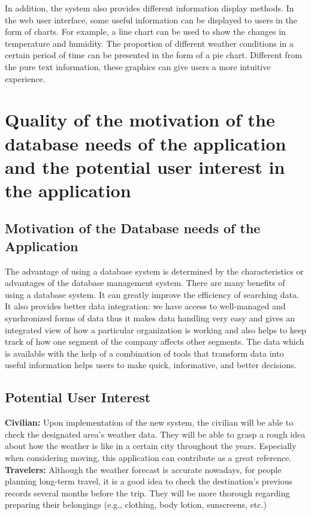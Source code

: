\documentclass[]{article}
\begin{document}
	\noindent In addition, the system also provides different information display methods. In the web user interface, some useful information can be displayed to users in the form of charts. For example, a line chart can be used to show the changes in temperature and humidity. The proportion of different weather conditions in a certain period of time can be presented in the form of a pie chart. Different from the pure text information, these graphics can give users a more intuitive experience.

\section{Quality of the motivation of the database needs of the application and the potential user interest in the application}

	\subsection{Motivation of the Database needs of the Application}
	
	The advantage of using a database system is determined by the characteristics or advantages of the database management system. There are many benefits of using a database system. It can greatly improve the efficiency of searching data. It also provides better data integration:  we have access to well-managed and synchronized forms of data thus it makes data handling very easy and gives an integrated view of how a particular organization is working and also helps to keep track of how one segment of the company affects other segments. The data which is available with the help of a combination of tools that transform data into useful information helps users to make quick, informative, and better decisions.
	
	\subsection{Potential User Interest}

	\noindent \textbf{Civilian:} Upon implementation of the new system, the civilian will be able to check the designated area's weather data. They will be able to grasp a rough idea about how the weather is like in a certain city throughout the years. Especially when considering moving, this application can contribute as a great reference.\\
	
	\noindent \textbf{Travelers:} Although the weather forecast is accurate nowadays, for people planning long-term travel, it is a good idea to check the destination’s previous records several months before the trip. They will be more thorough regarding preparing their belongings (e.g., clothing, body lotion, sunscreens, etc.)  \\
	
\end{document}
